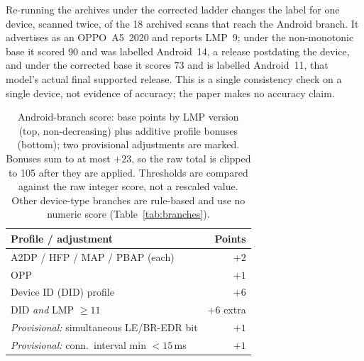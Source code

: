 \documentclass[conference]{IEEEtran}
\begin{document}
Re-running the archives under the corrected ladder changes the label for one
device, scanned twice, of the 18 archived scans that reach the Android branch.
It advertises as an OPPO~A5~2020 and reports LMP~9; under the non-monotonic
base it scored 90 and was labelled Android~14, a release postdating the
device, and under the corrected base it scores 73 and is labelled Android~11,
that model's actual final supported release. This is a single consistency
check on a single device, not evidence of accuracy; the paper makes no
accuracy claim.

\begin{table}[h]
\centering
\footnotesize
\renewcommand{\arraystretch}{1.15}
\caption{Android-branch score: base points by LMP version (top,
non-decreasing) plus additive profile bonuses (bottom); two provisional
adjustments are marked. Bonuses sum to at most $+23$, so the raw total is
clipped to 105 after they are applied. Thresholds are compared against the
raw integer score, not a rescaled value. Other device-type branches are
rule-based and use no numeric score (Table~\ref{tab:branches}).}
\label{tab:weights}

\vspace{4pt}
\begin{tabular}{@{}l r@{}}
\toprule
\textbf{Profile / adjustment} & \textbf{Points} \\
\midrule
A2DP / HFP / MAP / PBAP (each) & $+2$ \\
OPP & $+1$ \\
Device ID (DID) profile & $+6$ \\
\quad DID \emph{and} LMP $\ge 11$ & $+6$ extra \\
\emph{Provisional:} simultaneous LE/BR-EDR bit & $+1$ \\
\emph{Provisional:} conn.\ interval min $<15$\,ms & $+1$ \\
\bottomrule
\end{tabular}
\end{table}
\end{document}
